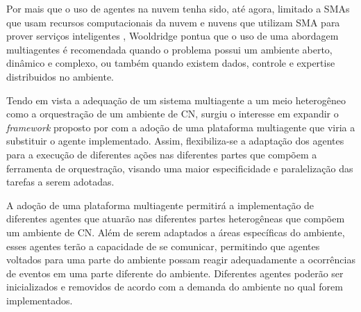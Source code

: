 Por mais que o uso de agentes na nuvem tenha sido, até agora, limitado a SMAs que usam recursos computacionais da nuvem e nuvens que utilizam SMA para prover serviços inteligentes \cite{a-prieta}, Wooldridge pontua que o uso de uma abordagem multiagentes é recomendada quando o problema possui um ambiente aberto, dinâmico e complexo, ou também quando existem dados, controle e expertise distribuidos no ambiente. \par

Tendo em vista a adequação de um sistema multiagente a um meio heterogêneo como a orquestração de um ambiente de CN, surgiu o interesse em expandir o \emph{framework} proposto por  com a adoção de uma plataforma multiagente que viria a substituir o agente implementado. Assim, flexibiliza-se a adaptação dos agentes para a execução de diferentes ações nas diferentes partes que compõem a ferramenta de orquestração, visando uma maior especificidade e paralelização das tarefas a serem adotadas. \par

A adoção de uma plataforma multiagente permitirá a implementação de diferentes agentes que atuarão nas diferentes partes heterogêneas que compõem um ambiente de CN. Além de serem adaptados a áreas específicas do ambiente, esses agentes terão a capacidade de se comunicar, permitindo que agentes voltados para uma parte do ambiente possam reagir adequadamente a ocorrências de eventos em uma parte diferente do ambiente. Diferentes agentes poderão ser inicializados e removidos de acordo com a demanda do ambiente no qual forem implementados. \par
